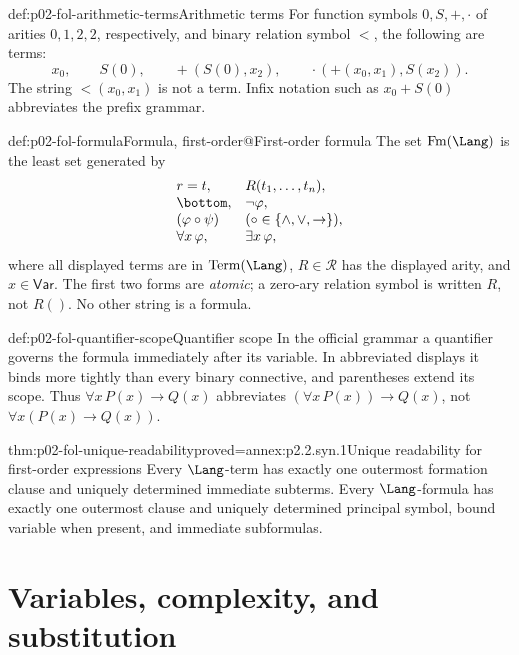 \begin{hbexample}{def:p02-fol-arithmetic-terms}{Arithmetic terms}
For function symbols \(0,S,+,\cdot\) of arities \(0,1,2,2\), respectively,
and binary relation symbol \(<\), the following are terms:
\[
 x_0,\qquad S(0),\qquad +(S(0),x_2),\qquad
 \cdot(+(x_0,x_1),S(x_2)).
\]
The string \(<(x_0,x_1)\) is not a term.  Infix notation such as
\(x_0+S(0)\) abbreviates the prefix grammar.
\end{hbexample}

\begin{hbdefinition}{def:p02-fol-formula}{Formula, first-order@First-order formula}
The set \(\operatorname{Fm}(\Lang)\) is the least set generated by
\[
\begin{array}{ll}
 r=t,&R(t_1,\ldots,t_n),\\
 \bottom,&\neg\varphi,\\
 (\varphi\circ\psi)&(\circ\in\{\land,\lor,\to\}),\\
 \forall x\,\varphi,&\exists x\,\varphi,
\end{array}
\]
where all displayed terms are in \(\operatorname{Term}(\Lang)\),
\(R\in\mathcal R\) has the displayed arity, and
\(x\in\mathsf{Var}\).  The first two forms are \emph{atomic}; a zero-ary
relation symbol is written \(R\), not \(R()\).  No other string is a
formula.
\end{hbdefinition}

\begin{hbconvention}{def:p02-fol-quantifier-scope}{Quantifier scope}
In the official grammar a quantifier governs the formula immediately after
its variable.  In abbreviated displays it binds more tightly than every
binary connective, and parentheses extend its scope.  Thus
\(\forall x\,P(x)\to Q(x)\) abbreviates
\((\forall x\,P(x))\to Q(x)\), not
\(\forall x(P(x)\to Q(x))\).
\end{hbconvention}

\begin{hbtheorem}{thm:p02-fol-unique-readability}{proved=annex:p2.2.syn.1}{Unique readability for first-order expressions}
Every \(\Lang\)-term has exactly one outermost formation clause and uniquely
determined immediate subterms.  Every \(\Lang\)-formula has exactly one
outermost clause and uniquely determined principal symbol, bound variable
when present, and immediate subformulas.
\end{hbtheorem}

\section{Variables, complexity, and substitution}
\label{sec:p02-fol-substitution}

